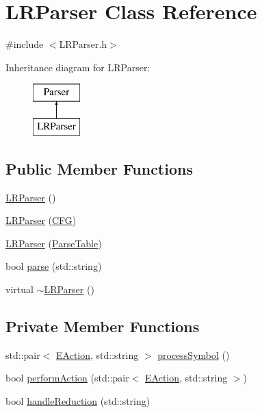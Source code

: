 \hypertarget{classLRParser}{\section{L\-R\-Parser Class Reference}
\label{classLRParser}
}


{\ttfamily \#include $<$L\-R\-Parser.\-h$>$}

Inheritance diagram for L\-R\-Parser\-:\begin{figure}[H]
\begin{center}
\leavevmode
\includegraphics[height=2.000000cm]{d6/de9/classLRParser}
\end{center}
\end{figure}
\subsection*{Public Member Functions}
\begin{DoxyCompactItemize}
\item 
\hyperlink{classLRParser_adf2fe54095f02900d06389007a1e5f53}{L\-R\-Parser} ()
\item 
\hyperlink{classLRParser_abee4e9919e49f66051167487fb467601}{L\-R\-Parser} (\hyperlink{classCFG}{C\-F\-G})
\item 
\hyperlink{classLRParser_a52727298bd32f6b4ac91d2e1351ffe49}{L\-R\-Parser} (\hyperlink{classParseTable}{Parse\-Table})
\item 
bool \hyperlink{classLRParser_a0657ab1ec68beb8fce3756f7204079b4}{parse} (std\-::string)
\item 
virtual \hyperlink{classLRParser_a85b1487a331f1a617ee74965264fcf8f}{$\sim$\-L\-R\-Parser} ()
\end{DoxyCompactItemize}
\subsection*{Private Member Functions}
\begin{DoxyCompactItemize}
\item 
std\-::pair$<$ \hyperlink{ParseTable_8h_a81d4868b129e5f45325894085a36a8a5}{E\-Action}, std\-::string $>$ \hyperlink{classLRParser_a3bd6bff5276c4ee9b592a14e31e789b3}{process\-Symbol} ()
\item 
bool \hyperlink{classLRParser_aa2a11e0af8cbc1bb23b522f1a2ca87e5}{perform\-Action} (std\-::pair$<$ \hyperlink{ParseTable_8h_a81d4868b129e5f45325894085a36a8a5}{E\-Action}, std\-::string $>$)
\item 
bool \hyperlink{classLRParser_ab355d762edcb2c7da1f30728d08b43a1}{handle\-Reduction} (std\-::string)
\end{DoxyCompactItemize}
